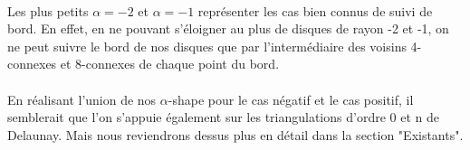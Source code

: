 \paragraph{}
Les plus petits $\alpha = -2$ et $\alpha = -1$ représenter les cas bien connus de suivi de bord. En effet, en ne pouvant s'éloigner au plus de disques de rayon -2 et -1, on ne peut suivre le bord de nos disques que par l'intermédiaire des voisins 4-connexes et 8-connexes de chaque point du bord.

\paragraph{}
En réalisant l'union de nos $\alpha$-shape pour le cas négatif et le cas positif, il semblerait que l'on s'appuie également sur les triangulations d'ordre 0 et n de Delaunay. Mais nous reviendrons dessus plus en détail dans la section "Existants".\\

